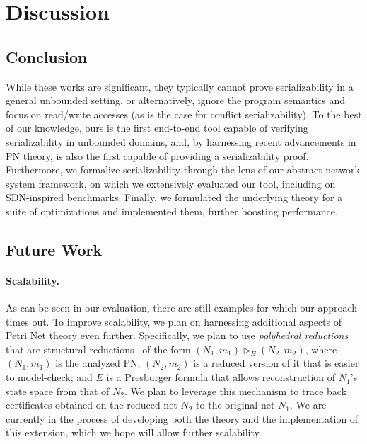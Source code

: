 \section{Discussion}
\label{sec:discussion}

\subsection{Conclusion}

While these works are significant, they typically cannot prove serializability in a general unbounded setting, or alternatively, ignore the program semantics and focus on read/write accesses (as is the case for conflict serializability).
%
To the best of our knowledge, ours is the first end-to-end
tool capable of verifying serializability in unbounded domains, and, by harnessing recent advancements in PN theory, is also the first capable of providing a serializability proof.
%
Furthermore, we formalize serializability through the lens of our abstract network system framework, on which we extensively evaluated our tool, including on SDN-inspired benchmarks. 
%
Finally, we formulated the underlying theory for a suite of optimizations and implemented them, further boosting performance.

%

\subsection{Future Work}

\paragraph{Scalability.}

As can be seen in our evaluation, there are still examples for which our approach times out.
To improve scalability, we plan on harnessing additional aspects of Petri Net theory even further.
%
Specifically, we plan to use \textit{polyhedral reductions}~\cite{AmBeDa21} that are structural reductions~\cite{Be87,BeLeDa20} of the form $(N_1, m_1) \vartriangleright_E (N_2, m_2)$, where $(N_1, m_1)$ is the analyzed PN; $(N_2, m_2)$ is a reduced version of it that is easier to model-check; and $E$ is a Presburger formula that allows reconstruction of $N_1$'s state space from that of $N_2$. We plan to leverage this mechanism to trace back certificates obtained on the reduced net $N_2$ to the original net $N_1$.
%
%
%
We are currently in the process of developing both the theory and the implementation of this extension,
which we hope will allow further scalability.

